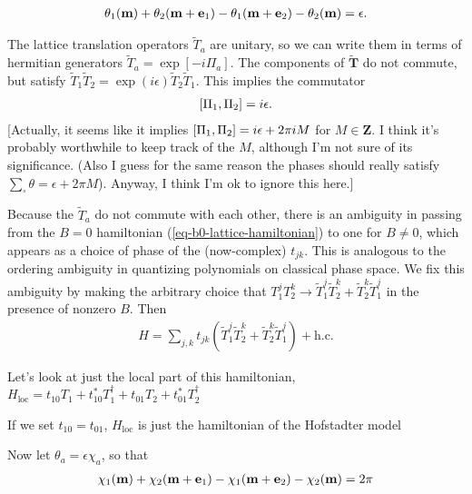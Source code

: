 \documentclass[aps,prb,twocolumn,letterpaper,twoside,nobalancelastpage,groupedaddress,amsmath,amssymb,floatfix,citeautoscript]{revtex4-1}
\begin{document}
\begin{align*}
\theta_1(\mathbf{m}) + \theta_2(\mathbf{m} + \mathbf{e}_1) - \theta_1(\mathbf{m} + \mathbf{e}_2) - \theta_2(\mathbf{m}) = \epsilon.
\end{align*}

The lattice translation operators $\widetilde{T}_a$ are unitary, so we can write them in terms of hermitian generators $\widetilde{T}_a = \exp\left[-i \Pi_a\right]$. The components of $\widetilde{\mathbf{T}}$ do not commute, but satisfy $\widetilde{T}_1 \widetilde{T}_2 = \exp(i\epsilon) \widetilde{T}_2 \widetilde{T}_1 $. This implies the commutator
\begin{align*}
\comm{\Pi_1}{\Pi_2} = i \epsilon.
\end{align*}
[Actually, it seems like it implies $\comm{\Pi_1}{\Pi_2} = i \epsilon + 2\pi i M$ for $M \in \mathbf{Z}$. I think it's probably worthwhile to keep track of the $M$, although I'm not sure of its significance. (Also I guess for the same reason the phases should really satisfy $\sum_{\square}\theta = \epsilon + 2\pi M$). Anyway, I think I'm ok to ignore this here.]

Because the $\widetilde{T}_a$ do not commute with each other, there is an ambiguity in passing from the $B=0$ hamiltonian (\ref{eq-b0-lattice-hamiltonian}) to one for $B\neq0$, which appears as a choice of phase of the (now-complex) $t_{jk}$. This is analogous to the ordering ambiguity in quantizing polynomials on classical phase space. We fix this ambiguity by making the arbitrary choice that $T_1^j T_2^k \rightarrow \widetilde{T}_1^j \widetilde{T}_2^k + \widetilde{T}_2^k\widetilde{T}_1^j$ in the presence of nonzero $B$. Then
\begin{align*}
H = \sum_{j,k} t_{jk}\left(\widetilde{T}_1^j \widetilde{T}_2^k + \widetilde{T}_2^k\widetilde{T}_1^j\right) + \text{h.c.}
\end{align*}


Let's look at just the local part of this hamiltonian, $H_{\text{loc}} = t_{10}T_1 + t^{\ast}_{10}T_1^{\dag} + t_{01}T_2 + t^{\ast}_{01}T_2^{\dag}$

If we set $t_{10} = t_{01}$, $H_{\text{loc}}$ is just the hamiltonian of the Hofstadter model





Now let $\theta_a = \epsilon \chi_a$, so that
\begin{align*}
\chi_1(\mathbf{m}) + \chi_2(\mathbf{m} + \mathbf{e}_1) - \chi_1(\mathbf{m} + \mathbf{e}_2) - \chi_2(\mathbf{m}) = 2\pi
\end{align*}
\end{document}
